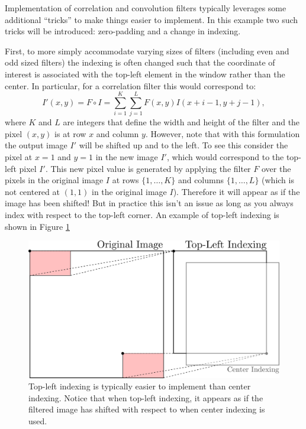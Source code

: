 \begin{example} \label{ex:padding}
\theoremstyle{definition}
Implementation of correlation and convolution filters typically leverages some additional ``tricks'' to make things easier to implement. In this example two such tricks will be introduced: zero-padding and a change in indexing. 

First, to more simply accommodate varying sizes of filters (including even and odd sized filters) the indexing is often changed such that the coordinate of interest is associated with the top-left element in the window rather than the center. In particular, for a correlation filter this would correspond to:
\begin{equation}
  \label{eq:correlation_newindex}
    I'(x,y) = F \circ I = \sum_{i=1}^K \sum_{j=1}^L F(x,y)I(x+i-1,y+j-1),
\end{equation}
where $K$ and $L$ are integers that define the width and height of the filter and the pixel $(x,y)$ is at row $x$ and column $y$. However, note that with this formulation the output image $I'$ will be shifted up and to the left. To see this consider the pixel at $x=1$ and $y=1$ in the new image $I'$, which would correspond to the top-left pixel $I'$. This new pixel value is generated by applying the filter $F$ over the pixels in the original image $I$ at rows $\{1,\dots,K\}$ and columns $\{1,\dots,L\}$ (which is not centered at $(1,1)$ in the original image $I$). Therefore it will appear as if the image has been shifted! But in practice this isn't an issue as long as you always index with respect to the top-left corner. An example of top-left indexing is shown in Figure \ref{fig:topleftfilter}
\begin{figure}[ht]
  \centering
  \includegraphics[width=.65\textwidth]{tex/figs/ch10_figs/topleftfilter_nopadding.png}
    \caption{Top-left indexing is typically easier to implement than center indexing. Notice that when top-left indexing, it appears as if the filtered image has shifted with respect to when center indexing is used.}
    \label{fig:topleftfilter}
\end{figure}


\end{example}
